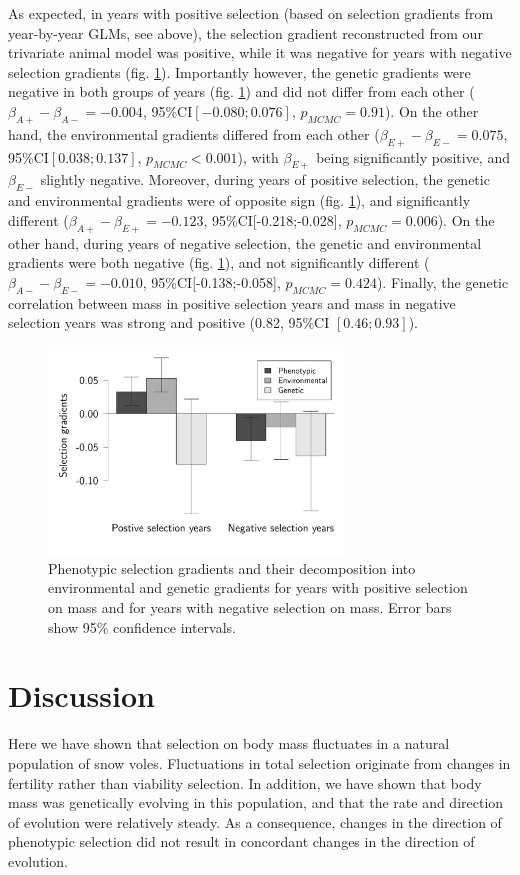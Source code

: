 As expected, in years with positive selection (based on selection gradients from year-by-year GLMs, see above), the selection gradient reconstructed from our trivariate animal model was positive, while it was negative for years with negative selection gradients (fig. \ref{fig:betas}). Importantly however, the genetic gradients were negative in both groups of years (fig. \ref{fig:betas}) and did not differ from each other ($\beta_{A+}-\beta_{A-} = -0.004$, 95\%CI$ [-0.080;0.076]$, $p_{MCMC}=0.91$). On the other hand, the environmental gradients differed from each other ($\beta_{E+}-\beta_{E-} = 0.075$, 95\%CI$ [0.038;0.137]$, $p_{MCMC}<0.001$), with $\beta_{E+}$ being significantly positive, and $\beta_{E-}$ slightly negative.
Moreover, during years of positive selection, the genetic and environmental gradients were of opposite sign (fig. \ref{fig:betas}), and significantly different ($\beta_{A+}-\beta_{E+} = -0.123$, 95\%CI[-0.218;-0.028], $p_{MCMC}=0.006$).
On the other hand, during years of negative selection, the genetic and environmental gradients were both negative (fig. \ref{fig:betas}), and not significantly different ($\beta_{A-}-\beta_{E-} = -0.010$, 95\%CI[-0.138;-0.058], $p_{MCMC}=0.424$). Finally, the genetic correlation between mass in positive selection years and mass in negative selection years was strong and positive (0.82, 95\%CI $[0.46; 0.93]$).

\begin{figure}[ht]
\centering
\includegraphics[width=0.7\textwidth]{FiguresFluSel/Betas-1}
\caption{\footnotesize Phenotypic selection gradients and their decomposition into environmental and genetic gradients for years with positive selection on mass and for years with negative selection on mass. Error bars show 95\% confidence intervals.}
\label{fig:betas}
\end{figure}


\section*{Discussion}
Here we have shown that selection on body mass fluctuates in a natural population of snow voles. Fluctuations in total selection originate from changes in fertility rather than viability selection. 
In addition, we have shown that body mass was genetically evolving in this population, and that the rate and direction of evolution were relatively steady. As a consequence, changes in the direction of phenotypic selection did not result in concordant changes in the direction of evolution.

